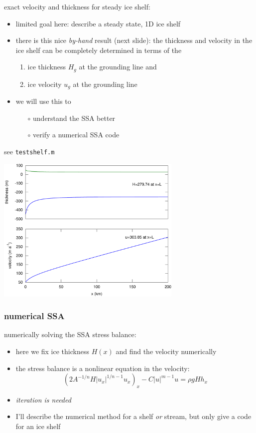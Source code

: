 \documentclass[titlepage,letterpaper,final,12pt]{scrartcl}
\newcommand{\alert}[1]{\emph{#1}}
\begin{document}
exact velocity and thickness for steady ice shelf:
\begin{itemize}
\item limited goal here: describe a steady state, 1D ice shelf
\item there is this nice \alert{by-hand} result (next slide): the thickness and velocity in the ice shelf can be completely determined \cite{MacAyealBarcilon,vanderVeen83} in terms of the 
  \begin{enumerate}
  \item ice thickness $H_g$ at the grounding line and
  \item ice velocity $u_g$ at the grounding line
  \end{enumerate}
\item we will use this to
  \begin{itemize}
  \item[$\circ$] understand the SSA better
  \item[$\circ$] verify a numerical SSA code
  \end{itemize}
\end{itemize}

see \texttt{testshelf.m} 

\begin{center}
  \includegraphics[width=3.5in]{steadyshelf}
\end{center}


\subsubsection*{numerical SSA}

numerically solving the SSA stress balance:
\begin{itemize}
\item here we fix ice thickness $H(x)$ and find the velocity numerically
\item the stress balance is a nonlinear equation in the velocity:
  $$\left(2 A^{-1/n} H |u_x|^{1/n - 1} u_x\right)_x - C|u|^{m-1}u = \rho g H h_x$$
\item \alert{iteration is needed}
\item I'll describe the numerical method for a shelf \emph{or} stream, but only give a code for an ice shelf
\end{itemize}
\end{document}
